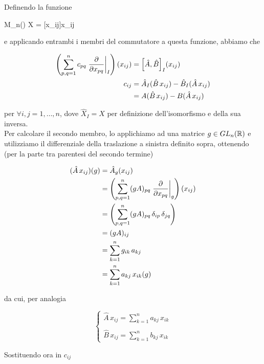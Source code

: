 Definendo la funzione

%
	{M_{n}(\R)}{\R}%
	{X = [x_{ij}]}{x_{ij}}

e applicando entrambi i membri del commutatore a questa funzione, abbiamo che

\begin{align}
	\begin{split}
		\left( \sum_{p,q=1}^{n} c_{pq} \eval{ \pdv{x_{pq}} }_{I} \right)(x_{ij}) &= \comm{\hat{A}}{\hat{B}}_{I} (x_{ij})\\
		c_{ij} &= \hat{A}_{I} (\hat{B} \, x_{ij}) - \hat{B}_{I} (\hat{A} \, x_{ij})\\
		&= A (\hat{B} \, x_{ij}) - B (\hat{A} \, x_{ij})
	\end{split}
\end{align}

per $ \forall i,j = 1,\dots,n $, dove $ \hat{X}_{I} = X $ per definizione dell'isomorfismo e della sua inversa.\\
Per calcolare il secondo membro, lo applichiamo ad una matrice $ g \in GL_{n}(\mathbb{R}) $ e utilizziamo il differenziale della traslazione a sinistra definito sopra, ottenendo (per la parte tra parentesi del secondo termine)

\begin{align}
	\begin{split}
		(\hat{A} \, x_{ij})(g) &= \hat{A}_{g} (x_{ij})\\
		&= \left( \sum_{p,q=1}^{n} (g A)_{pq} \eval{ \pdv{x_{pq}} }_{g} \right)(x_{ij})\\
		&= \left( \sum_{p,q=1}^{n} (g A)_{pq} \, \delta_{ip} \, \delta_{jq} \right)\\
		&= (g A)_{ij}\\
		&= \sum_{k=1}^{n} g_{ik} \, a_{kj}\\
		&= \sum_{k=1}^{n} a_{kj} \, x_{ik}(g)
	\end{split}
\end{align}

da cui, per analogia

\begin{equation}
	\begin{cases}
		\hat{A} \, x_{ij} = \displaystyle\sum_{k=1}^{n} a_{kj} \, x_{ik}\\\\
		\hat{B} \, x_{ij} = \displaystyle\sum_{k=1}^{n} b_{kj} \, x_{ik}
	\end{cases}
\end{equation}

Sostituendo ora in $ c_{ij} $

